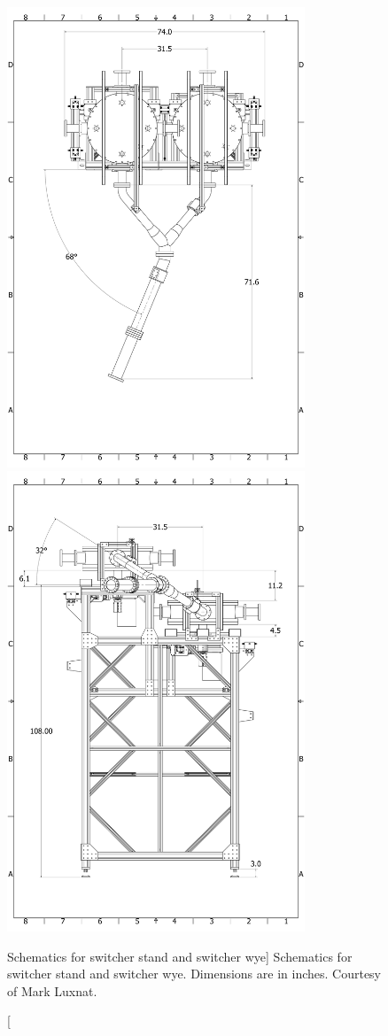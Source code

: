 \begin{figure}
    \centering
    \includegraphics[width=3.5in]{figures/switcher_horizontals.pdf}
    \includegraphics[width=3.5in]{figures/switcher_verticals.pdf}
    \caption
    [Schematics for switcher stand and switcher wye]
    {Schematics for switcher stand and switcher wye. Dimensions are in inches. Courtesy of Mark Luxnat.}
    \label{fig:switcher_stand_measurements}
\end{figure}


